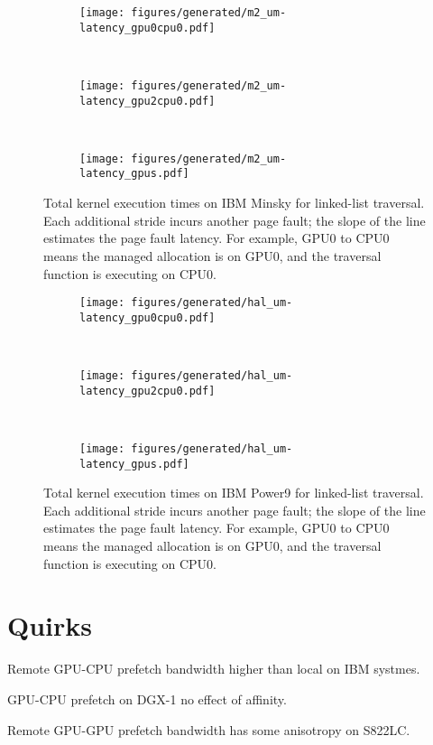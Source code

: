 \begin{figure}[ht]
    \centering
    \begin{subfigure}[b]{0.3\textwidth}
        \texttt{[image: figures/generated/m2\_um-latency\_gpu0cpu0.pdf]}
        \caption{}
        \label{}
    \end{subfigure}
    ~
    \begin{subfigure}[b]{0.3\textwidth}
        \texttt{[image: figures/generated/m2\_um-latency\_gpu2cpu0.pdf]}
        \caption{}
        \label{}
    \end{subfigure}
    ~
    \begin{subfigure}[b]{0.3\textwidth}
        \texttt{[image: figures/generated/m2\_um-latency\_gpus.pdf]}
        \caption{}
        \label{}
    \end{subfigure}
    \caption[]{ 
        Total kernel execution times on IBM Minsky for linked-list traversal.
        Each additional stride incurs another page fault; the slope of the line estimates the page fault latency.
        For example, GPU0 to CPU0 means the managed allocation is on GPU0, and the traversal function is executing on CPU0.
    }
    \label{fig:minsky-page-fault-latency}
\end{figure}


\begin{figure}[ht]
    \centering
    \begin{subfigure}[b]{0.3\textwidth}
        \texttt{[image: figures/generated/hal\_um-latency\_gpu0cpu0.pdf]}
        \caption{}
        \label{}
    \end{subfigure}
    ~
    \begin{subfigure}[b]{0.3\textwidth}
        \texttt{[image: figures/generated/hal\_um-latency\_gpu2cpu0.pdf]}
        \caption{}
        \label{}
    \end{subfigure}
    ~
    \begin{subfigure}[b]{0.3\textwidth}
        \texttt{[image: figures/generated/hal\_um-latency\_gpus.pdf]}
        \caption{}
        \label{}
    \end{subfigure}
    \caption[]{
        Total kernel execution times on IBM Power9 for linked-list traversal.
        Each additional stride incurs another page fault; the slope of the line estimates the page fault latency.
        For example, GPU0 to CPU0 means the managed allocation is on GPU0, and the traversal function is executing on CPU0.
        }
    \label{fig:hal-page-fault-latency}
\end{figure}

\section{Quirks}

Remote GPU-CPU prefetch bandwidth higher than local on IBM systmes.

GPU-CPU prefetch on DGX-1 no effect of affinity.

Remote GPU-GPU prefetch bandwidth has some anisotropy on S822LC.